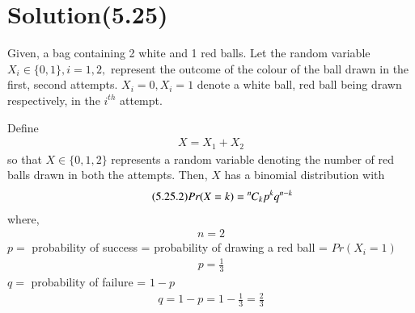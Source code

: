 \documentclass[journal,12pt,twocolumn]{IEEEtran}
\begin{document}
\section*{Solution(5.25)}
Given, a bag containing 2 white and 1 red balls. Let the random variable $X_{i}\in\{0,1\},i=1,2,$ represent the outcome of the colour of the ball drawn in the first, second attempts. $X_{i}=0,X_{i}=1$ denote a white ball, red ball being drawn respectively, in the $i^{th}$ attempt.
\begin{comment}
As the ball drawn in the first attempt is replaced in the bag, for both the attempts, the number of balls of a specified colour, and their probability  mass function's (pmf's) remain the same. i.e, 
\begin{align}
    \tag{5.25.1}
    n(X_{i}=0)=2\\
    \tag{5.25.2}
    n(X_{i}=1)=1\\
    \tag{5.25.3}
    \therefore n(X_{i}=0)+n(X_{i}=1)=3 
\end{align}
and
\begin{align}
    \tag{5.25.4}
    \Pr(X_{i}=j) = 
	\begin{cases}
	\dfrac{2}{3}, &j=0 \\~\\[-1em]
	\dfrac{1}{3}, &j=1 \\~\\[-1em]
	0, & otherwise
	\end{cases}
\end{align}
\newpage
\end{comment}
\newline
\newline
Define 
\begin{align}
    \tag{5.25.1}
    X=X_{1}+X_{2}
\end{align}
so that $X\in\{0,1,2\}$ represents a random variable denoting the number of red balls drawn in both the attempts. Then, $X$ has a binomial distribution with 
\begin{align}
    \tag{5.25.2}
    Pr(X=k)={{{}^{n}\mkern-1muC_{k}}}p^{k}q^{n-k}
\end{align}
where,
\begin{align}
    \tag{5.25.3}
    n=2
\end{align}
$p =$ probability of success = probability of drawing a red ball = $Pr(X_{i}=1)$
\begin{align}
    \tag{5.25.4}
    p=\frac{1}{3}
\end{align}
$q =$ probability of failure = $1-p$
\begin{align}
    \tag{5.25.5}
    q=1-p=1-\frac{1}{3}=\frac{2}{3}
\end{align}
\end{document}

